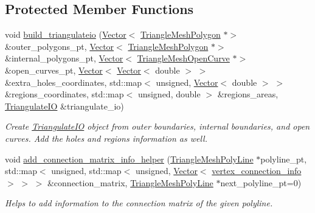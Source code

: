 \subsection*{Protected Member Functions}
\begin{DoxyCompactItemize}
\item 
void \hyperlink{classoomph_1_1UnstructuredTwoDMeshGeometryBase_aeb1d5b9a7d4860e6dbc0698c453895ad}{build\+\_\+triangulateio} (\hyperlink{classoomph_1_1Vector}{Vector}$<$ \hyperlink{classoomph_1_1TriangleMeshPolygon}{Triangle\+Mesh\+Polygon} $\ast$$>$ \&outer\+\_\+polygons\+\_\+pt, \hyperlink{classoomph_1_1Vector}{Vector}$<$ \hyperlink{classoomph_1_1TriangleMeshPolygon}{Triangle\+Mesh\+Polygon} $\ast$$>$ \&internal\+\_\+polygons\+\_\+pt, \hyperlink{classoomph_1_1Vector}{Vector}$<$ \hyperlink{classoomph_1_1TriangleMeshOpenCurve}{Triangle\+Mesh\+Open\+Curve} $\ast$$>$ \&open\+\_\+curves\+\_\+pt, \hyperlink{classoomph_1_1Vector}{Vector}$<$ \hyperlink{classoomph_1_1Vector}{Vector}$<$ double $>$ $>$ \&extra\+\_\+holes\+\_\+coordinates, std\+::map$<$ unsigned, \hyperlink{classoomph_1_1Vector}{Vector}$<$ double $>$ $>$ \&regions\+\_\+coordinates, std\+::map$<$ unsigned, double $>$ \&regions\+\_\+areas, \hyperlink{structoomph_1_1TriangulateIO}{Triangulate\+IO} \&triangulate\+\_\+io)
\begin{DoxyCompactList}\small\item\em Create \hyperlink{structoomph_1_1TriangulateIO}{Triangulate\+IO} object from outer boundaries, internal boundaries, and open curves. Add the holes and regions information as well. \end{DoxyCompactList}\item 
void \hyperlink{classoomph_1_1UnstructuredTwoDMeshGeometryBase_ae05fb2391856e555435632c64fa63f08}{add\+\_\+connection\+\_\+matrix\+\_\+info\+\_\+helper} (\hyperlink{classoomph_1_1TriangleMeshPolyLine}{Triangle\+Mesh\+Poly\+Line} $\ast$polyline\+\_\+pt, std\+::map$<$ unsigned, std\+::map$<$ unsigned, \hyperlink{classoomph_1_1Vector}{Vector}$<$ \hyperlink{structoomph_1_1UnstructuredTwoDMeshGeometryBase_1_1vertex__connection__info}{vertex\+\_\+connection\+\_\+info} $>$ $>$ $>$ \&connection\+\_\+matrix, \hyperlink{classoomph_1_1TriangleMeshPolyLine}{Triangle\+Mesh\+Poly\+Line} $\ast$next\+\_\+polyline\+\_\+pt=0)
\begin{DoxyCompactList}\small\item\em Helps to add information to the connection matrix of the given polyline. \end{DoxyCompactList}\item 
$$
\end{DoxyCompactItemize}
